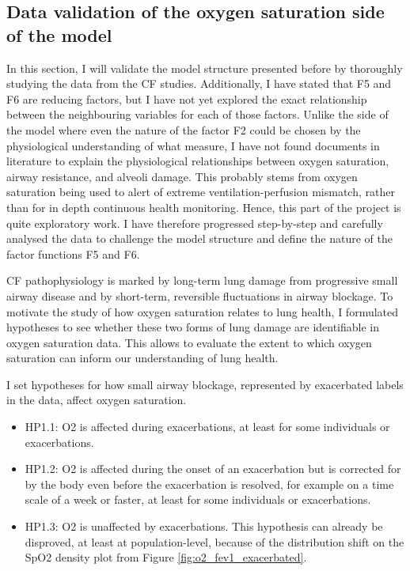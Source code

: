 
\subsection{Data validation of the oxygen saturation side of the model}

In this section, I will validate the model structure presented before by thoroughly studying the data from the CF studies. Additionally, I have stated that F5 and F6 are reducing factors, but I have not yet explored the exact relationship between the neighbouring variables for each of those factors. Unlike the \F side of the model where even the nature of the factor F2 could be chosen by the physiological understanding of what \F measure, I have not found documents in literature to explain the physiological relationships between oxygen saturation, airway resistance, and alveoli damage. This probably stems from oxygen saturation being used to alert of extreme ventilation-perfusion mismatch, rather than for in depth continuous health monitoring. Hence, this part of the project is quite exploratory work. I have therefore progressed step-by-step and carefully analysed the data to challenge the model structure and define the nature of the factor functions F5 and F6.

CF pathophysiology is marked by long-term lung damage from progressive small airway disease and by short-term, reversible fluctuations in airway blockage. To motivate the study of how oxygen saturation relates to lung health, I formulated hypotheses to see whether these two forms of lung damage are identifiable in oxygen saturation data. This allows to evaluate the extent to which oxygen saturation can inform our understanding of lung health.

I set hypotheses for how small airway blockage, represented by exacerbated labels in the data, affect oxygen saturation.
\begin{itemize}
    \item HP1.1: O2 is affected during exacerbations, at least for some individuals or exacerbations.
\item HP1.2: O2 is affected during the onset of an exacerbation but is corrected for by the body even before the exacerbation is resolved, for example on a time scale of a week or faster, at least for some individuals or exacerbations.
\item HP1.3: O2 is unaffected by exacerbations. This hypothesis can already be disproved, at least at population-level, because of the distribution shift on the SpO2 density plot from Figure \ref{fig:o2_fev1_exacerbated}.
\end{itemize}

